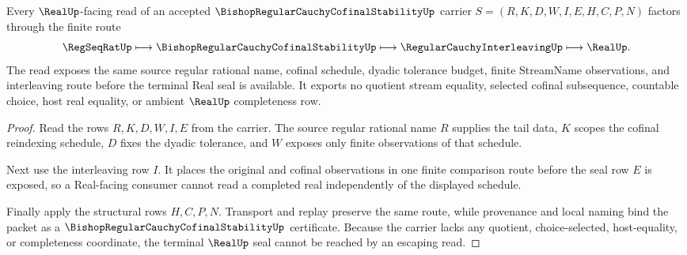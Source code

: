 \begin{theorem}
\label{thm:bishop-regular-cauchy-cofinal-stability-real-seal}
Every $\RealUp$-facing read of an accepted $\BishopRegularCauchyCofinalStabilityUp$ carrier $S=(R,K,D,W,I,E,H,C,P,N)$ factors through the finite route
$$
\RegSeqRatUp \longmapsto \BishopRegularCauchyCofinalStabilityUp \longmapsto \RegularCauchyInterleavingUp \longmapsto \RealUp .
$$
The read exposes the same source regular rational name, cofinal schedule, dyadic tolerance budget, finite StreamName observations, and interleaving route before the terminal Real seal is available. It exports no quotient stream equality, selected cofinal subsequence, countable choice, host real equality, or ambient $\RealUp$ completeness row.
\end{theorem}
\begin{proof}
Read the rows $R,K,D,W,I,E$ from the carrier. The source regular rational name $R$ supplies the tail data, $K$ scopes the cofinal reindexing schedule, $D$ fixes the dyadic tolerance, and $W$ exposes only finite observations of that schedule.

Next use the interleaving row $I$. It places the original and cofinal observations in one finite comparison route before the seal row $E$ is exposed, so a Real-facing consumer cannot read a completed real independently of the displayed schedule.

Finally apply the structural rows $H,C,P,N$. Transport and replay preserve the same route, while provenance and local naming bind the packet as a $\BishopRegularCauchyCofinalStabilityUp$ certificate. Because the carrier lacks any quotient, choice-selected, host-equality, or completeness coordinate, the terminal $\RealUp$ seal cannot be reached by an escaping read.
\end{proof}


